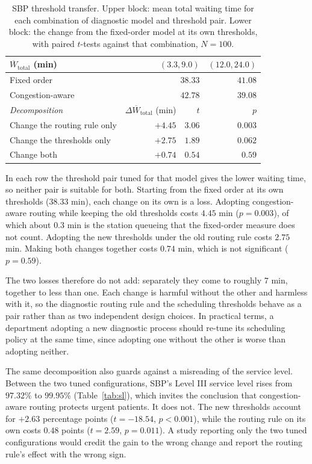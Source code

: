 \documentclass[sigconf]{acmart}
\newcommand{\Wtot}{\overline{W}_{\text{total}}}
\begin{document}
\begin{table}[t]
\caption{SBP threshold transfer. Upper block: mean total waiting time for each
combination of diagnostic model and threshold pair. Lower block: the change
from the fixed-order model at its own thresholds, with paired $t$-tests against
that combination, $N=100$.}
\label{tab:transfer}
\small
\setlength{\tabcolsep}{4pt}
\begin{tabular}{@{}lrrr@{}}
\toprule
$\Wtot$ (min) & \multicolumn{2}{r}{$(3.3,9.0)$} & $(12.0,24.0)$ \\
\midrule
Fixed order       & \multicolumn{2}{r}{$\mathbf{38.33}$} & $41.08$ \\
Congestion-aware  & \multicolumn{2}{r}{$42.78$} & $\mathbf{39.08}$ \\
\midrule
\textit{Decomposition} & $\Delta\Wtot$ (min) & $t$ & $p$ \\
Change the routing rule only & $+4.45$ & $3.06$ & $0.003$ \\
Change the thresholds only   & $+2.75$ & $1.89$ & $0.062$ \\
Change both                  & $+0.74$ & $0.54$ & $0.59$ \\
\bottomrule
\end{tabular}
\end{table}

In each row the threshold pair tuned for that model gives the lower waiting
time, so neither pair is suitable for both. Starting from the fixed order at
its own thresholds ($38.33$ min), each change on its own is a loss. Adopting
congestion-aware routing while keeping the old thresholds costs $4.45$ min
($p=0.003$), of which about $0.3$ min is the station queueing that the
fixed-order measure does not count. Adopting the new thresholds under the old
routing rule costs $2.75$ min. Making both changes together costs $0.74$ min,
which is not significant ($p=0.59$).

The two losses therefore do not add: separately they come to roughly $7$ min,
together to less than one. Each change is harmful without the other and
harmless with it, so the diagnostic routing rule and the scheduling thresholds
behave as a pair rather than as two independent design choices. In practical
terms, a department adopting a new diagnostic process should re-tune its
scheduling policy at the same time, since adopting one without the other is
worse than adopting neither.

The same decomposition also guards against a misreading of the service level.
Between the two tuned configurations, SBP's Level III service level rises from
$97.32\%$ to $99.95\%$ (Table~\ref{tab:sl}), which invites the conclusion that
congestion-aware routing protects urgent patients. It does not. The new
thresholds account for $+2.63$ percentage points ($t=-18.54$, $p<0.001$), while
the routing rule on its own costs $0.48$ points ($t=2.59$, $p=0.011$). A study
reporting only the two tuned configurations would credit the gain to the wrong
change and report the routing rule's effect with the wrong sign.
\end{document}
